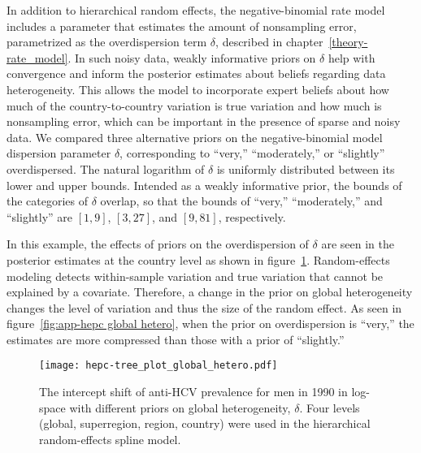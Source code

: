 In addition to hierarchical random effects, the negative-binomial
rate model includes a parameter that estimates
the amount of nonsampling error, parametrized as the overdispersion
term $\delta$, described in chapter~\ref{theory-rate_model}.
In such noisy data, weakly informative priors on $\delta$ help with
convergence and inform the posterior estimates about beliefs
regarding data heterogeneity.  This allows the model to incorporate
expert beliefs about how much of the country-to-country variation is
true variation and how much is nonsampling error, which can be
important in the presence of sparse and noisy data.  We compared three
alternative priors on the negative-binomial model dispersion
parameter $\delta$, corresponding to ``very,'' ``moderately,'' or
``slightly'' overdispersed.  The natural logarithm of $\delta$ is
uniformly distributed between its lower and upper bounds.  Intended as
a weakly informative prior, the bounds of the categories of $\delta$ overlap, so
that the bounds of ``very,'' ``moderately,'' and ``slightly'' are $[1,9]$, $[3,27]$, and
$[9,81]$, respectively.

In this example, the effects of priors on the overdispersion of
$\delta$ are seen in the posterior estimates at the country level as
shown in figure~\ref{fig:app-hepc global hetero}.  Random-effects
modeling detects within-sample variation and true variation that
cannot be explained by a covariate.  Therefore, a change in the prior
on global heterogeneity changes the level of variation and thus the
size of the random effect.  As seen in figure~\ref{fig:app-hepc global
  hetero}, when the prior on overdispersion is ``very,'' the estimates
are more compressed than those with a prior of ``slightly.''

    \begin{figure}[h]
        \begin{center}
            \texttt{[image: hepc-tree\_plot\_global\_hetero.pdf]}
            \caption[The intercept shift of anti-HCV
              prevalence with different priors on global heterogeneity.]{The intercept shift of anti-HCV
              prevalence for men in 1990 in log-space with different priors on
              global heterogeneity, $\delta$.  Four levels (global,
              superregion, region, country) were used in the
              hierarchical random-effects spline model.}
            \label{fig:app-hepc global hetero}
        \end{center}
    \end{figure}


